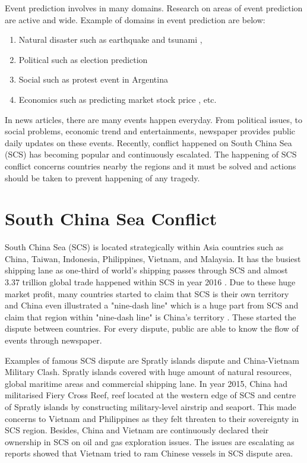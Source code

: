 \documentclass[twoside]{utmthesis}
\begin{document}
Event prediction involves in many domains. Research on areas of event prediction are active and wide. Example of domains in event prediction are below:
\begin{enumerate}
	\item Natural disaster such as earthquake \citep{asencio2017medium,asim2017earthquake} and tsunami \citep{mulia2016real},
	\item Political such as election prediction \citep{tung2016mining}
	\item Social such as protest event in Argentina  \citep{ning2016modeling}
	\item Economics such as predicting market stock price \citep{ding2015deep,vargas2017deep}, etc.  
\end{enumerate}

In news articles, there are many events happen everyday. From political issues, to social problems, economic trend and entertainments, newspaper provides public daily updates on these events. Recently, conflict happened on South China Sea (SCS) has becoming popular and continuously escalated. The happening of SCS conflict concerns countries nearby the regions and it must be solved and actions should be taken to prevent happening of any tragedy.     


\section{South China Sea Conflict}
South China Sea (SCS) is located strategically within Asia countries such as China, Taiwan, Indonesia, Philippines, Vietnam, and Malaysia. It has the busiest shipping lane as one-third of world's shipping passes through SCS and almost 3.37 trillion global trade happened within SCS in year 2016  \citep{chinapower2016}. Due to these huge market profit, many countries started to claim that SCS is their own territory and China even illustrated a "nine-dash line" which is a huge part from SCS and claim that region within "nine-dash line" is China's territory \citep{liuzhen2014}. These started the dispute between countries. For every dispute, public are able to know the flow of events through newspaper.

Examples of famous SCS dispute are Spratly islands dispute and China-Vietnam Military Clash. Spratly islands covered with huge amount of natural resources, global maritime areas and commercial shipping lane. In year 2015, China had militarised Fiery Cross Reef, reef located at the western edge of SCS and centre of Spratly islands by constructing military-level airstrip and seaport. This made concerns to Vietnam and Philippines as they felt threaten to their sovereignty in SCS region. Besides, China and Vietnam are continuously declared their ownership in SCS on oil and gas exploration issues. The issues are escalating as reports \citep{vietnamBoat2014} showed that Vietnam tried to ram Chinese vessels in SCS dispute area.     
 
\end{document}
